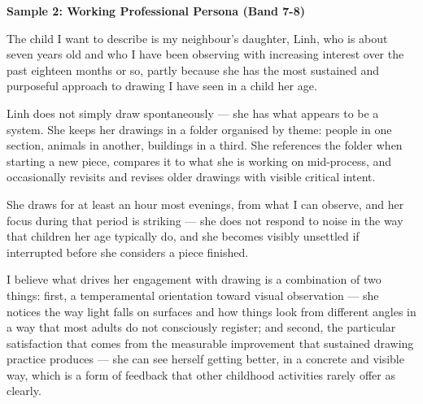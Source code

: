 \begin{ieltsanswer}
\textbf{Sample 2: Working Professional Persona (Band 7-8)}

The child I want to describe is my neighbour's daughter, Linh, who is about seven years old and who I have been observing with increasing interest over the past eighteen months or so, partly because she has the most sustained and purposeful approach to drawing I have seen in a child her age.

Linh does not simply draw spontaneously — she has what appears to be a system. She keeps her drawings in a folder organised by theme: people in one section, animals in another, buildings in a third. She references the folder when starting a new piece, compares it to what she is working on mid-process, and occasionally revisits and revises older drawings with visible critical intent.

She draws for at least an hour most evenings, from what I can observe, and her focus during that period is striking — she does not respond to noise in the way that children her age typically do, and she becomes visibly unsettled if interrupted before she considers a piece finished.

I believe what drives her engagement with drawing is a combination of two things: first, a temperamental orientation toward visual observation — she notices the way light falls on surfaces and how things look from different angles in a way that most adults do not consciously register; and second, the particular satisfaction that comes from the measurable improvement that sustained drawing practice produces — she can see herself getting better, in a concrete and visible way, which is a form of feedback that other childhood activities rarely offer as clearly.
\end{ieltsanswer}


